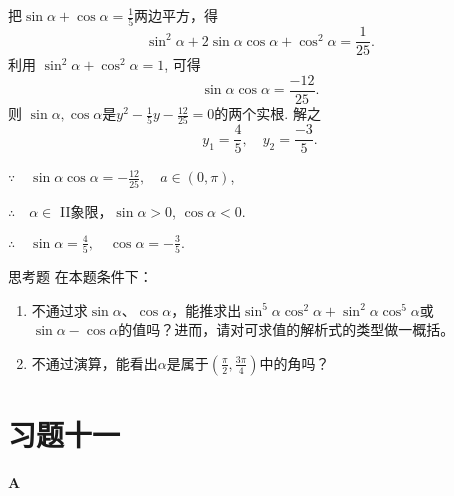 \begin{solution}
    把$\sin\alpha+\cos\alpha=\frac{1}{5}$两边平方，得
$$\sin^2\alpha+2\sin\alpha\cos\alpha+\cos^2\alpha=\frac{1}{25}.$$
利用 $\sin^2\alpha+\cos^2\alpha=1$, 可得
$$\sin\alpha\cos\alpha=\frac{-12}{25}.$$
则 $\sin \alpha , \cos \alpha$是$y^2-\frac{1}{5}y-\frac{12}{25}=0$的两个实根.
 解之
$$y_1=\frac{4}{5},\quad y_2=\frac{-3}{5}.$$


$\because\quad \sin \alpha \cos \alpha = - \frac {12}{25},\quad a\in ( 0, \pi )$,

$\therefore\quad \alpha \in$ II象限，$\sin\alpha>0$, $\cos\alpha<0$.

$\therefore\quad \sin\alpha= \frac {4}{5},\quad \cos\alpha=-\frac{3}{5}.$
\end{solution}

\begin{thm}{思考题}
    在本题条件下：
\begin{enumerate}[(1)]
\item 不通过求$\sin\alpha$、$\cos\alpha$，能推求出$\sin^5\alpha\cos^2\alpha+
\sin^2\alpha\cos^5\alpha$或$\sin\alpha-\cos\alpha$的值吗？进而，请对可求值的解析式的类型做一概括。
\item 不通过演算，能看出$\alpha$是属于$\left(\frac{\pi}{2},\frac{3\pi}{4}\right)$中的角吗？
\end{enumerate}
\end{thm}

\section*{习题十一}
\begin{center}
    \bfseries A
\end{center}

